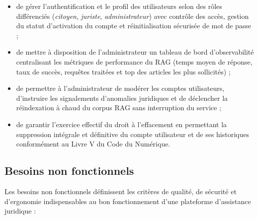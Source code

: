 \begin{itemize}
    \item de gérer l'authentification et le profil des utilisateurs selon des rôles différenciés (\textit{citoyen}, \textit{juriste}, \textit{administrateur}) avec contrôle des accès, gestion du statut d'activation du compte et réinitialisation sécurisée de mot de passe ;
    
    \item de mettre à disposition de l'administrateur un tableau de bord d'observabilité centralisant les métriques de performance du RAG (temps moyen de réponse, taux de succès, requêtes traitées et top des articles les plus sollicités) ;
    
    \item de permettre à l'administrateur de modérer les comptes utilisateurs, d'instruire les signalements d'anomalies juridiques et de déclencher la réindexation à chaud du corpus RAG sans interruption du service ;
    
    \item de garantir l'exercice effectif du droit à l'effacement en permettant la suppression intégrale et définitive du compte utilisateur et de ses historiques conformément au Livre V du Code du Numérique.
\end{itemize}

\subsection{Besoins non fonctionnels}

Les besoins non fonctionnels définissent les critères de qualité, de sécurité et d'ergonomie indispensables au bon fonctionnement d'une plateforme d'assistance juridique :

